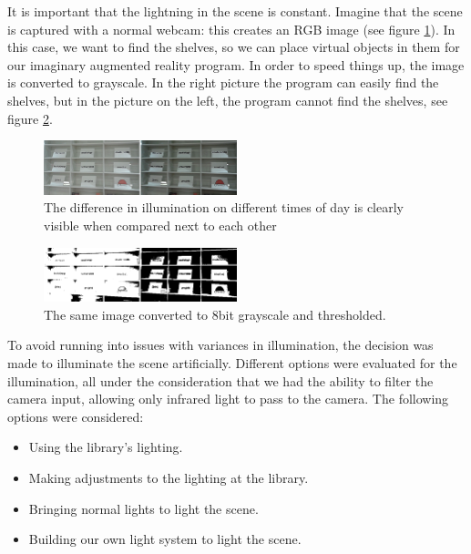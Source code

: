 It is important that the lightning in the scene is constant. Imagine that the scene is captured with a normal webcam: this creates an RGB image (see figure \ref{fig:scene_light}). In this case, we want to find the shelves, so we can place virtual objects in them for our imaginary augmented reality program. In order to speed things up, the image is converted to grayscale. In the right picture the program can easily find the shelves, but in the picture on the left, the program cannot find the shelves, see figure \ref{fig:scene_thresholded}.

\begin{figure}[htbp] 
\centering 
\includegraphics[width=0.5\textwidth]{Pictures/HjoerringLibrary/scene_lighting.png} 
\caption{The difference in illumination on different times of day is clearly visible when compared next to each other} 
\label{fig:scene_light} 
\end{figure}

\begin{figure}[htbp] 
\centering 
\includegraphics[width=0.5\textwidth]{Pictures/HjoerringLibrary/scene_lighting_thresholded.png} 
\caption{The same image converted to 8bit grayscale and thresholded.} 
\label{fig:scene_thresholded} 
\end{figure}

To avoid running into issues with variances in illumination, the decision was made to illuminate the scene artificially. Different options were evaluated for the illumination, all under the consideration that we had the ability to filter the camera input, allowing only infrared light to pass to the camera. The following options were considered:

\begin{itemize}
\item Using the library's lighting.
\item Making adjustments to the lighting at the library.
\item Bringing normal lights to light the scene.
\item Building our own light system to light the scene.
\end{itemize}

